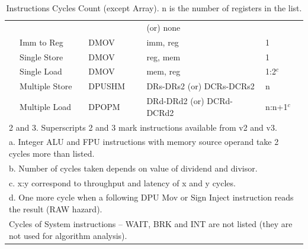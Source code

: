 \begin{table}
\begin{subtable}{\linewidth}
\begin{center}
\begin{tabular}{lllll}
                   &                    &                                        & (or) none                          &                          \\
                   & Imm to Reg         & DMOV                                   & imm, reg                           & 1                        \\
                   & Single Store       & DMOV                                   & reg, mem                           & 1                        \\
                   & Single Load        & DMOV                                   & mem, reg                           & 1:2$^c$                  \\
                   & Multiple Store     & DPUSHM                                 & DRs-DRs2 (or) DCRs-DCRs2           & n                        \\
                   & Multiple Load      & DPOPM                                  & DRd-DRd2 (or) DCRd-DCRd2           & n:n+1$^c$                \\ \hline
\multicolumn{5}{l}{2 and 3. Superscripts 2 and 3 mark instructions available from v2 and v3.}                                                    \\
\multicolumn{5}{l}{a. Integer ALU and FPU instructions with memory source operand take 2 cycles more than listed.}                               \\
\multicolumn{5}{l}{b. Number of cycles taken depends on value of dividend and divisor.}                                                          \\
\multicolumn{5}{l}{c. x:y correspond to throughput and latency of x and y cycles.}                                                               \\
\multicolumn{5}{l}{d. One more cycle when a following DPU Mov or Sign Inject instruction reads the result (RAW hazard).}                         \\
\multicolumn{5}{l}{Cycles of System instructions -- WAIT, BRK and INT are not listed (they are not used for algorithm analysis).}
\end{tabular}
\end{center}
\captionsetup{font=scriptsize, labelfont=scriptsize}
\caption{Instructions Cycles Count (except Array). n is the number of registers in the list.}
\end{subtable}


\end{table}
